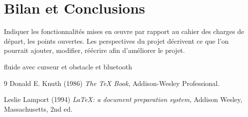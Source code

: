 \documentclass[a4paper]{article}
\begin{document}
\section{Bilan et Conclusions}

	Indiquer les fonctionnalités mises en œuvre par rapport au cahier des charges de départ, les points ouvertes.
	Les perspectives du projet décrivent ce que l’on pourrait ajouter, modifier, réécrire afin d’améliorer le projet.
    \begin{itemize}
    {\color{WildStrawberry}
    \item  fluide avec curseur et obstacle et bluetooth
    }
    \end{itemize}
	
\begin{thebibliography}{9}
Donald E. Knuth (1986) \emph{The \TeX{} Book}, Addison-Wesley Professional.

Leslie Lamport (1994) \emph{\LaTeX: a document preparation system}, Addison
Wesley, Massachusetts, 2nd ed.
\end{thebibliography}
\end{document}
